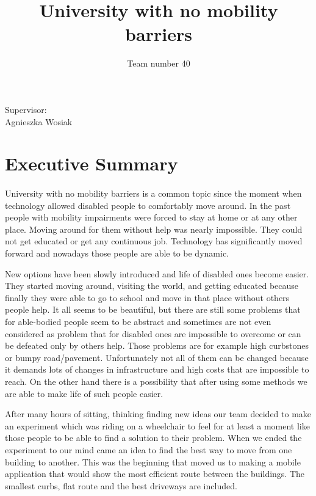 \documentclass[12pt]{article}
\begin{document}
\begin{titlepage}
\title{University with no mobility barriers}
\date {}
\author{Team number 40}
\maketitle
{}
\vfill
\raggedright
Supervisor: \\ Agnieszka Wosiak
\end{titlepage}


\section*{Executive Summary}
\paragraph{}University with no mobility barriers is a common topic since the moment when technology allowed disabled people to comfortably move around. In the past people with mobility impairments were forced to stay at home or at any other place. Moving around for them without help was nearly impossible. They could not get educated or get any continuous job. Technology has significantly moved forward and nowadays those people are able to be dynamic.

New options have been slowly introduced and life of disabled ones become easier. They started moving around, visiting the world, and getting educated because finally they were able to go to school and move in that place without others people help. It all seems to be beautiful, but there are still some problems that for able-bodied people seem to be abstract  and sometimes are not even considered as problem that for disabled ones are impossible to overcome or can be defeated only by others help. Those problems are for example high curbstones or bumpy road/pavement. Unfortunately not all of them can be changed because it demands lots of changes in infrastructure and high costs that are impossible to reach. On the other hand there is a possibility that after using some methods we are able to make life of such people easier. 

After many hours of sitting, thinking finding new ideas our team decided to make an experiment which was riding on a wheelchair to feel for at least a moment like those people to be able to find a solution to their problem. When we ended the experiment to our mind came an idea to find the best way to move from one building to another. This was the beginning that moved us to making a mobile application that would show the most efficient route between the buildings. The smallest curbs, flat route and the best driveways are included. 
\end{document}

